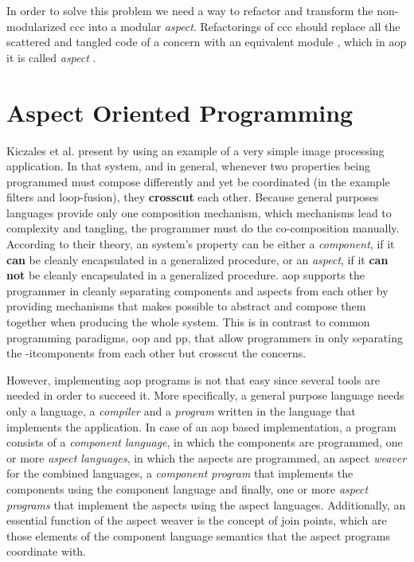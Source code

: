 In order to solve this problem we need a way to refactor and transform the non-modularized \ac{ccc} into a modular \textit{aspect}.
Refactorings of \ac{ccc} should replace all the scattered and tangled code of a concern with an equivalent module \cite{hannemann2005role}, which in \ac{aop} it is called \textit{aspect} \cite{kiczales1997aspect}.

\section{Aspect Oriented Programming}\label{Aspect Oriented Programming}

Kiczales et al. present \cite{kiczales1997aspect} by using an example of a very simple image processing application. 
In that system, and in general, whenever two properties being programmed must compose differently and yet be coordinated (in the example filters and loop-fusion), they \textbf{crosscut} each other.
Because general purposes languages provide only one composition mechanism, which mechanisms lead to complexity and tangling, the programmer must do the co-composition manually. 
According to their theory, an system's property can be either a \textit{component}, if it \textbf{can} be cleanly encapsulated in a generalized procedure, or an \textit{aspect}, if it \textbf{can not} be cleanly encapsulated in a generalized procedure. 
\ac{aop} supports the programmer in cleanly separating components and aspects from each other by providing mechanisms that makes possible to abstract and compose them together when producing the whole system. 
This is in contrast to common programming paradigms, \ac{oop} and \ac{pp}, that allow programmers in only separating the \text-it{components} from each other but crosscut the concerns.

However, implementing \ac{aop} programs is not that easy since several tools are needed in order to succeed it. 
More specifically, a general purpose language needs only a language, a \textit{compiler} and a \textit{program} written in the language that implements the application.
In case of an \ac{aop} based implementation, a program consists of a \textit{component language}, in which the components are programmed, one or more \textit{aspect languages}, in which the aspects are programmed, an aspect \textit{weaver} for the combined languages, a \textit{component program} that implements the components using the component language and finally, one or more \textit{aspect programs} that implement the aspects using the aspect languages.
Additionally, an essential function of the aspect weaver is the concept of join points, which are those elements of the component language semantics that the aspect programs coordinate with. 

